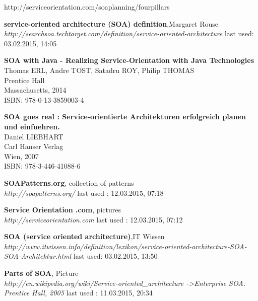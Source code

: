 \documentclass[12pt]{article}
\begin{document}
http://serviceorientation.com/soaplanning/fourpillars

\newpage

\listoffigures
\printglossaries
\begin{thebibliography}{56}

   \textbf{service-oriented architecture (SOA) definition},Margaret Rouse \\
  \textit{http://searchsoa.techtarget.com/definition/service-oriented-architecture}
  \newline last used: 03.02.2015, 14:05

   \textbf{SOA with Java - Realizing Service-Orientation with Java Technologies}\\
   Thomas ERL, Andre TOST, Satadru ROY, Philip THOMAS \\ 
   Prentice Hall \\
   Massachusetts, 2014 \\
	ISBN: 978-0-13-3859003-4 

   \textbf{SOA goes real : Service-orientierte Architekturen erfolgreich planen und einfuehren.}\\
   Daniel LIEBHART \\ 
   Carl Hanser Verlag \\
   Wien, 2007 \\
	ISBN: 978-3-446-41088-6

  \textbf{SOAPatterns.org}, collection of patterns\\
  \textit{http://soapatterns.org/}
  \newline last used : 12.03.2015, 07:18

  \textbf{Service Orientation .com}, pictures\\
  \textit{http://serviceorientation.com}
  \newline last used : 12.03.2015, 07:12

   \textbf{SOA (service oriented architecture)},IT Wissen \\
  \textit{http://www.itwissen.info/definition/lexikon/service-oriented-architecture-SOA-SOA-Architektur.html}
  \newline last used: 03.02.2015, 13:50

   
   \textbf{Parts of SOA}, Picture \\
  \textit{http://en.wikipedia.org/wiki/Service-oriented\_architecture -\textgreater Enterprise SOA. Prentice Hall, 2005}
  \newline last used : 11.03.2015, 20:34 	




\end{thebibliography}
\end{document}
